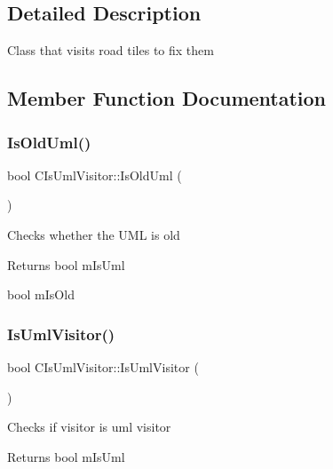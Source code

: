\subsection{Detailed Description}
Class that visits road tiles to fix them 

\subsection{Member Function Documentation}
\mbox{\label{class_c_is_uml_visitor_a12895fb90be2171da457e2d6a524d9d2}} 
\subsubsection{\texorpdfstring{IsOldUml()}{IsOldUml()}}
{\footnotesize\ttfamily bool C\+Is\+Uml\+Visitor\+::\+Is\+Old\+Uml (\begin{DoxyParamCaption}{ }\end{DoxyParamCaption})\hspace{0.3cm}{\ttfamily [inline]}}

Checks whether the U\+ML is old \begin{DoxyReturn}{Returns}
bool m\+Is\+Uml 

bool m\+Is\+Old 
\end{DoxyReturn}
\mbox{\label{class_c_is_uml_visitor_a5a4fad7fb8438c629ef0ff7ec171c721}} 
\subsubsection{\texorpdfstring{IsUmlVisitor()}{IsUmlVisitor()}}
{\footnotesize\ttfamily bool C\+Is\+Uml\+Visitor\+::\+Is\+Uml\+Visitor (\begin{DoxyParamCaption}{ }\end{DoxyParamCaption})\hspace{0.3cm}{\ttfamily [inline]}}

Checks if visitor is uml visitor \begin{DoxyReturn}{Returns}
bool m\+Is\+Uml 
\end{DoxyReturn}
\mbox{\label{class_c_is_uml_visitor_ac49fb3a73f9949c21faf54d92d366b7c}} 
